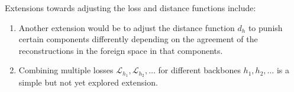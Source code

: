 \documentclass[10pt,twocolumn]{article}
\begin{document}
Extensions towards adjusting the loss and distance functions include:
\begin{enumerate}
    \item Another extension would be to adjust the distance function $d_h$ to punish certain components differently depending on the agreement of the reconstructions in the foreign space in that components.
    \item Combining multiple losses $\mathcal{L}_{h_1}, \mathcal{L}_{h_2}, \dots$ for different backbones $h_1, h_2, \dots$ is a simple but not yet explored extension.
\end{enumerate}




\end{document}
